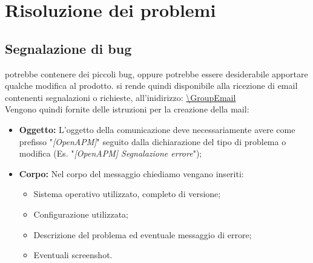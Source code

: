 \section{Risoluzione dei problemi}

	\subsection{Segnalazione di bug}

		\ProjectName{} potrebbe contenere dei piccoli bug, oppure potrebbe essere desiderabile apportare qualche modifica al prodotto. \GroupName{} si rende quindi disponibile alla ricezione di email contenenti segnalazioni o richieste, all'inidirizzo: \url{\GroupEmail} \\
		Vengono quindi fornite delle istruzioni per la creazione della mail:

		\begin{itemize}
			\item \textbf{Oggetto:} L'oggetto della comunicazione deve necessariamente avere come prefisso "\textit{[OpenAPM]}" seguito dalla dichiarazione del tipo di problema o modifica (Es. "\textit{[OpenAPM] Segnalazione errore}");
			\item \textbf{Corpo:} Nel corpo del messaggio chiediamo vengano inseriti:
				\begin{itemize}
					\item Sistema operativo utilizzato, completo di versione;
					\item Configurazione utilizzata;
					\item Descrizione del problema ed eventuale messaggio di errore;
					\item Eventuali screenshot.
				\end{itemize}
		\end{itemize}
